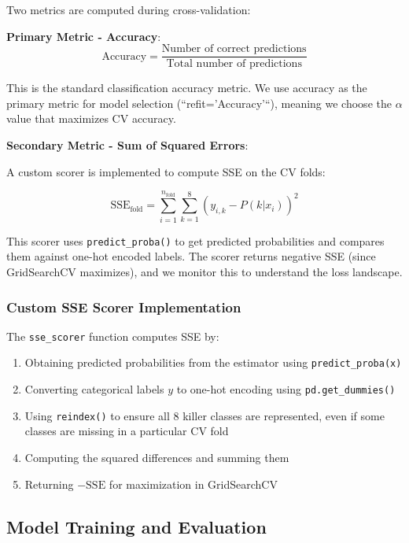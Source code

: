 \documentclass[12pt]{article}
\begin{document}
Two metrics are computed during cross-validation:

\textbf{Primary Metric - Accuracy}:
\begin{equation}
\text{Accuracy} = \frac{\text{Number of correct predictions}}{\text{Total number of predictions}}
\end{equation}

This is the standard classification accuracy metric. We use accuracy as the primary metric for model selection (``refit='Accuracy'``), meaning we choose the $\alpha$ value that maximizes CV accuracy.

\textbf{Secondary Metric - Sum of Squared Errors}:

A custom scorer is implemented to compute SSE on the CV folds:

\begin{equation}
\text{SSE}_{\text{fold}} = \sum_{i=1}^{n_{\text{fold}}} \sum_{k=1}^{8} (y_{i,k} - P(k|x_i))^2
\end{equation}

This scorer uses \texttt{predict\_proba()} to get predicted probabilities and compares them against one-hot encoded labels. The scorer returns negative SSE (since GridSearchCV maximizes), and we monitor this to understand the loss landscape.

\subsubsection{Custom SSE Scorer Implementation}

The \texttt{sse\_scorer} function computes SSE by:
\begin{enumerate}
    \item Obtaining predicted probabilities from the estimator using \texttt{predict\_proba(x)}
    \item Converting categorical labels $y$ to one-hot encoding using \texttt{pd.get\_dummies()}
    \item Using \texttt{reindex()} to ensure all 8 killer classes are represented, even if some classes are missing in a particular CV fold
    \item Computing the squared differences and summing them
    \item Returning $-\text{SSE}$ for maximization in GridSearchCV
\end{enumerate}

\subsection{Model Training and Evaluation}
\end{document}
